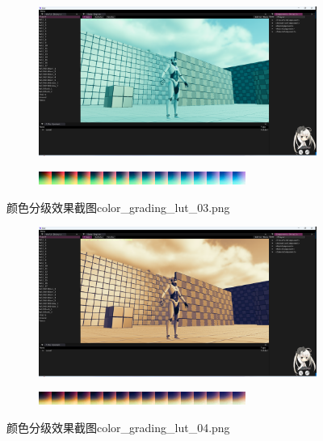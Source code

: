 \documentclass{ctexart}
\begin{document}
     \begin{figure}[!htb]
    	\centering
    	\begin{subfigure}{1.0\textwidth}
    		\includegraphics[width=\textwidth]{screen_shot_color_grading_map_color_grading_lut_03.png}
    	\end{subfigure}
    	\begin{subfigure}{1.0\textwidth}
    		\includegraphics[width=\textwidth]{color_grading_lut_03.png}
    	\end{subfigure}  	
    	\caption{颜色分级效果截图color\_grading\_lut\_03.png}
    \end{figure}    
    \begin{figure}[!htb]
    	\centering
    	\begin{subfigure}{1.0\textwidth}
    		\includegraphics[width=\textwidth]{screen_shot_color_grading_map_color_grading_lut_04.png}
    	\end{subfigure}
    	\begin{subfigure}{1.0\textwidth}
    		\includegraphics[width=\textwidth]{color_grading_lut_04.png}
    	\end{subfigure}  	
    	\caption{颜色分级效果截图color\_grading\_lut\_04.png}
    \end{figure}  
\end{document}
